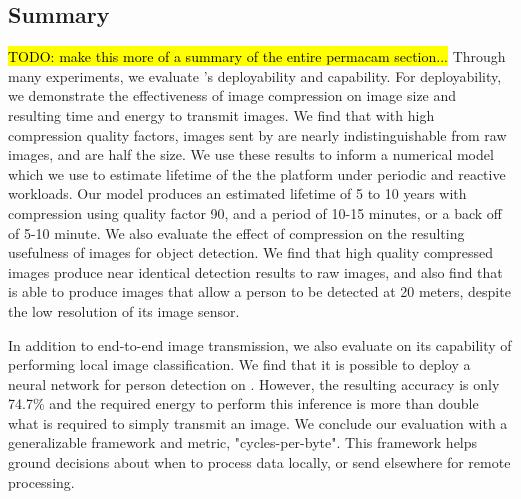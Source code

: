 
\subsection{Summary}
\hl{TODO: make this more of a summary of the entire permacam section...}
Through many experiments, we evaluate \name's deployability and capability. For deployability, we demonstrate the effectiveness of image compression on image size and resulting time and energy to transmit images. We find that with high compression quality factors, images sent by \name are nearly indistinguishable from raw images, and are half the size. We use these results to inform a numerical model which we use to estimate lifetime of the the \name platform under periodic and reactive workloads. Our model produces an estimated lifetime of 5 to 10 years with compression using quality factor 90, and a period of 10-15 minutes, or a back off of 5-10 minute. We also evaluate the effect of compression on the resulting usefulness of images for object detection. We find that high quality compressed images produce near identical detection results to raw images, and also find that \name is able to produce images that allow a person to be detected at 20 meters, despite the low resolution of its image sensor.

In addition to end-to-end image transmission, we also evaluate \name on its capability of performing local image classification. We find that it is possible to deploy a neural network for person detection on \name. However, the resulting accuracy is only 74.7\% and the required energy to perform this inference is more than double what is required to simply transmit an image. We conclude our evaluation with a generalizable framework and metric, "cycles-per-byte". This framework helps ground decisions about when to process data locally, or send elsewhere for remote processing.

